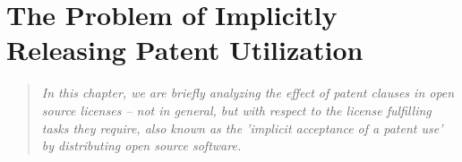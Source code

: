 %
%
%
%
%



\section{The Problem of Implicitly Releasing Patent Utilization}
\footnotesize \begin{quote}\itshape In this chapter, we are briefly analyzing
the effect of patent clauses in open source licenses -- not in general, but with
respect to the license fulfilling tasks they require, also known as the
'implicit acceptance of a patent use' by distributing open source software.
\end{quote}
\normalsize

